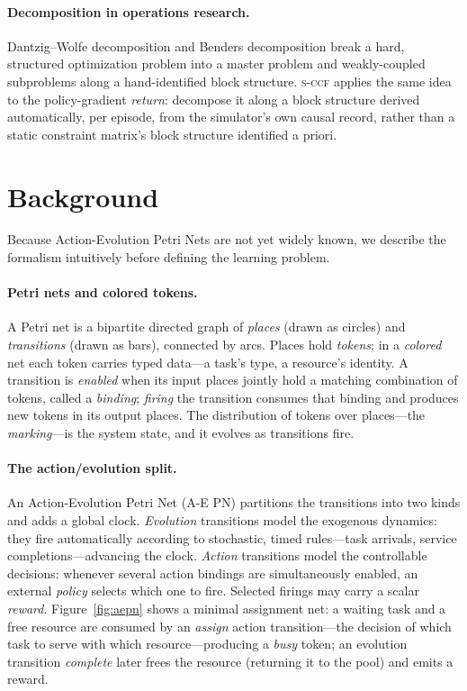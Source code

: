 \documentclass[review,authoryear,3p,times]{elsarticle}
\newcommand{\sccf}{\textsc{s-ccf}}
\begin{document}
\paragraph{Decomposition in operations research.} Dantzig--Wolfe decomposition
\citep{dantzig1960decomposition} and Benders decomposition
\citep{benders1962partitioning} break a hard, structured optimization problem
into a master problem and weakly-coupled subproblems along a hand-identified
block structure. \sccf{} applies the same idea to the policy-gradient
\emph{return}: decompose it along a block structure derived automatically,
per episode, from the simulator's own causal record, rather than a static
constraint matrix's block structure identified a priori.

\section{Background}
\label{sec:background}

Because Action-Evolution Petri Nets are not yet widely known, we describe the
formalism intuitively before defining the learning problem.

\paragraph{Petri nets and colored tokens.} A Petri net is a bipartite directed
graph of \emph{places} (drawn as circles) and \emph{transitions} (drawn as bars),
connected by arcs. Places hold \emph{tokens}; in a \emph{colored} net each token
carries typed data---a task's type, a resource's identity. A transition is
\emph{enabled} when its input places jointly hold a matching combination of
tokens, called a \emph{binding}; \emph{firing} the transition consumes that
binding and produces new tokens in its output places. The distribution of tokens
over places---the \emph{marking}---is the system state, and it evolves as
transitions fire.

\paragraph{The action/evolution split.} An Action-Evolution Petri Net (A-E PN)
\citep{aepn2023} partitions the transitions into two kinds and adds a global
clock. \emph{Evolution} transitions model the exogenous dynamics: they fire
automatically according to stochastic, timed rules---task arrivals, service
completions---advancing the clock. \emph{Action} transitions model the
controllable decisions: whenever several action bindings are simultaneously
enabled, an external \emph{policy} selects which one to fire. Selected firings may
carry a scalar \emph{reward}. Figure~\ref{fig:aepn} shows a minimal assignment
net: a waiting task and a free resource are consumed by an \emph{assign} action
transition---the decision of which task to serve with which resource---producing
a \emph{busy} token; an evolution transition \emph{complete} later frees the
resource (returning it to the pool) and emits a reward.
\end{document}
